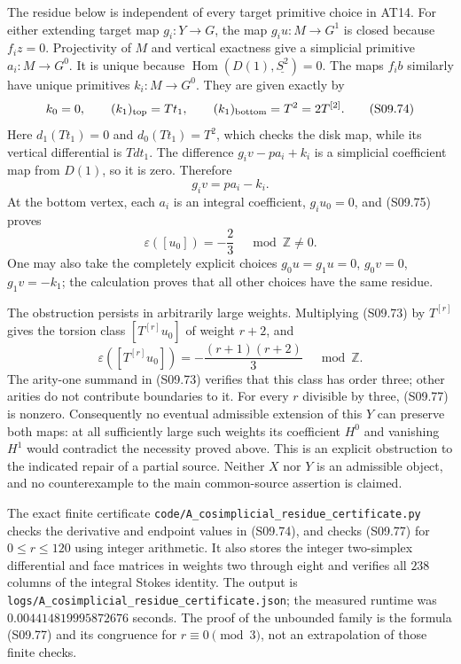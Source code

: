 The residue below is independent of every target
primitive choice in AT14.  For either extending
target map $g_i:Y\to G$, the map $g_i u:M\to G^1$
is closed because $f_i z=0$.  Projectivity of $M$
and vertical exactness give a simplicial primitive
$a_i:M\to G^0$.  It is unique because
$\operatorname{Hom}(D(1),\underline{S^2})=0$.
The maps $f_i b$ similarly have unique primitives
$k_i:M\to G^0$.  They are given exactly by
\[
 k_0=0,\qquad
 (k_1)_{\rm top}=Tt_1,\qquad
 (k_1)_{\rm bottom}=T^2=2T^{[2]}.                    \tag{S09.74}
\]
Here $d_1(Tt_1)=0$ and $d_0(Tt_1)=T^2$, which
checks the disk map, while its vertical differential
is $Tdt_1$.  The difference
$g_i v-p a_i+k_i$ is a simplicial coefficient map
from $D(1)$, so it is zero.  Therefore
\[
                          g_i v=p a_i-k_i.           \tag{S09.75}
\]
At the bottom vertex, each $a_i$ is an integral
coefficient, $g_i u_0=0$, and (S09.75) proves
\[
                  \varepsilon([u_0])=-\frac{2}{3}
                                      \quad\bmod\mathbb Z\ne0.
 \tag{S09.76}
\]
One may also take the completely explicit choices
$g_0u=g_1u=0$, $g_0v=0$, $g_1v=-k_1$;
the calculation proves that all other choices
have the same residue.

The obstruction persists in arbitrarily large weights.
Multiplying (S09.73) by $T^{[r]}$ gives the torsion
class $[T^{[r]}u_0]$ of weight $r+2$, and
\[
 \varepsilon([T^{[r]}u_0])
              =-\frac{(r+1)(r+2)}{3}\quad\bmod\mathbb Z.
 \tag{S09.77}
\]
The arity-one summand in (S09.73) verifies that this
class has order three; other arities do not contribute
boundaries to it.  For every $r$ divisible by three,
(S09.77) is nonzero.  Consequently no eventual
admissible extension of this $Y$ can preserve both
maps: at all sufficiently large such weights its
coefficient $H^0$ and vanishing $H^1$ would contradict
the necessity proved above.  This is an explicit
obstruction to the indicated repair of a partial
source.  Neither $X$ nor $Y$ is an admissible object,
and no counterexample to the main common-source
assertion is claimed.

The exact finite certificate
\texttt{code/A\_cosimplicial\_residue\_certificate.py}
checks the derivative and endpoint values in (S09.74),
and checks (S09.77) for $0\leq r\leq120$ using
integer arithmetic.  It also stores the integer
two-simplex differential and face matrices in
weights two through eight and verifies all $238$
columns of the integral Stokes identity.  The
output is
\texttt{logs/A\_cosimplicial\_residue\_certificate.json};
the measured runtime was $0.004414819995872676$ seconds.
The proof of the unbounded family is the formula
(S09.77) and its congruence for $r\equiv0\pmod3$,
not an extrapolation of those finite checks.
